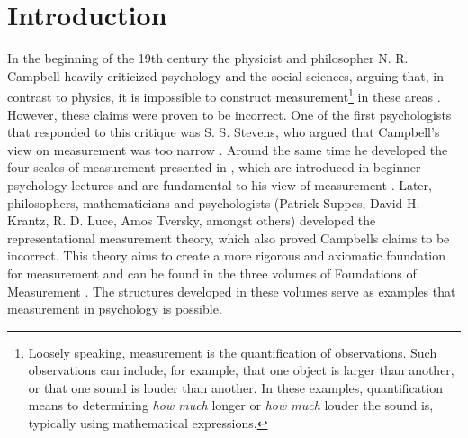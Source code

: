 \chapter{Introduction}
In the beginning of the 19th century the physicist and philosopher N. R. Campbell heavily criticized psychology and the social sciences, arguing that, in contrast to physics, it is impossible to construct measurement\footnote{Loosely speaking, measurement is the quantification of observations. Such observations can include, for example, that one object is larger than another, or that one sound is louder than another. In these examples, quantification means to determining \emph{how much} longer or \emph{how much} louder the sound is, typically using mathematical expressions.} in these areas \parencite{campbellPhysicsElements19201957}.
However, these claims were proven to be incorrect. One of the first psychologists that responded to this critique was S. S. Stevens, who argued that Campbell's view on measurement was too narrow \parencite{stevensPsychophysicsIntroductionIts1975, stevensMathematicsMeasurementPsychophysics1951}. Around the same time he developed the four scales of measurement presented in \textcite{stevensscales}, which are introduced in beginner psychology lectures and are fundamental to his view of measurement \parencite[p. 14]{luceRepresentationalMeasurementTheory2002}.
Later, philosophers, mathematicians and psychologists (Patrick Suppes, David H. Krantz, R. D. Luce, Amos Tversky, amongst others) developed the representational measurement theory, which also proved Campbells claims to be incorrect.
This theory aims to create a more rigorous and axiomatic foundation for measurement and can be found in the three volumes of Foundations of Measurement \parencite{foundations1, foundations2, foundations3}. The structures developed in these volumes serve as examples that measurement in psychology is possible.

